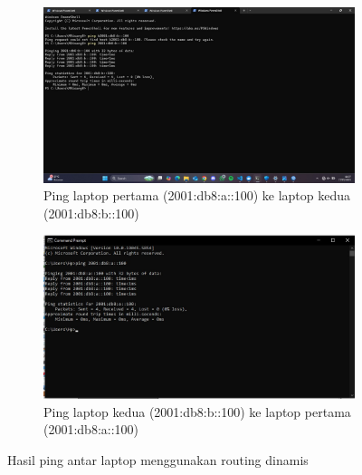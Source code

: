 \begin{enumerate}
	\begin{figure}[H]
		\centering
		\begin{subfigure}[b]{0.4\linewidth}
			\centering
			\includegraphics[width=\linewidth]{P2/img/router 1 laptop 1 (8).jpg}
			\caption{Ping laptop pertama (2001:db8:a::100) ke laptop kedua (2001:db8:b::100)\label{fig:konfigurasiR1}}
		\end{subfigure}
		\begin{subfigure}[b]{0.4\linewidth}
			\centering
			\includegraphics[width=\linewidth]{P2/img/router2 laptop2 (7).jpg}
			\caption{Ping laptop kedua (2001:db8:b::100) ke laptop pertama (2001:db8:a::100)\label{fig:konfigurasiR2}}
		\end{subfigure}
		\caption{Hasil ping antar laptop menggunakan routing dinamis}
		\hspace{1cm}
	\end{figure}
	
\end{enumerate}

